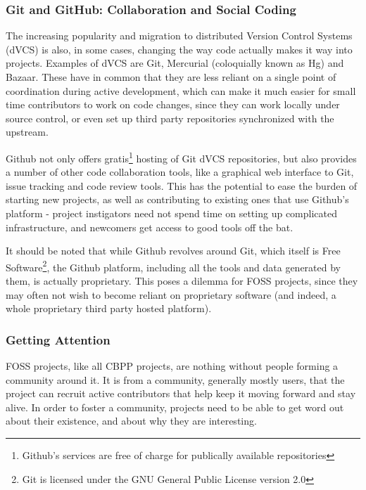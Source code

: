 \documentclass[a4paper,11pt]{article} %
\begin{document}
\subsubsection{Git and GitHub: Collaboration and Social Coding}

The increasing popularity and migration to distributed Version Control
Systems (dVCS) is also, in some cases, changing the way code actually makes
it way into projects. Examples of dVCS are Git, Mercurial (coloquially known
as Hg) and Bazaar. These have in common that they are less reliant on a
single point of coordination during active development, which can make it
much easier for small time contributors to work on code changes, since they
can work locally under source control, or even set up third party
repositories synchronized with the upstream.

Github not only offers gratis\footnote{Github's services are free of charge
  for publically available repositories} hosting of Git dVCS repositories,
but also provides a number of other code collaboration tools, like a
graphical web interface to Git, issue tracking and code review tools. This
has the potential to ease the burden of starting new projects, as well as
contributing to existing ones that use Github's platform - project
instigators need not spend time on setting up complicated infrastructure,
and newcomers get access to good tools off the bat.

It should be noted that while Github revolves around Git, which itself is
Free Software\footnote{Git is licensed under the GNU General Public License
  version 2.0}, the Github platform, including all the tools and data
generated by them, is actually proprietary. This poses a dilemma for FOSS
projects, since they may often not wish to become reliant on proprietary
software (and indeed, a whole proprietary third party hosted platform).


\subsubsection{Getting Attention}

FOSS projects, like all CBPP projects, are nothing without people forming a
community around it. It is from a community, generally mostly users, that
the project can recruit active contributors that help keep it moving forward
and stay alive. In order to foster a community, projects need to be able to
get word out about their existence, and about why they are interesting.
\end{document}
